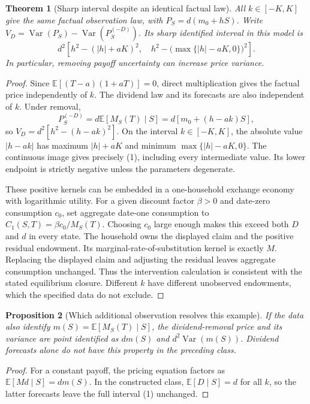 \documentclass[11pt,a4paper]{article}
\newtheorem{theorem}{Theorem}[section]
\newtheorem{proposition}[theorem]{Proposition}
\theoremstyle{definition}
\theoremstyle{remark}
\newcommand{\E}{\mathbb{E}}
\DeclareMathOperator{\Var}{Var}
\begin{document}
\begin{theorem}[Sharp interval despite an identical factual law]
All $k\in[-K,K]$ give the same factual observation law, with $P_S=d(m_0+hS)$. Write $V_D=\Var(P_S)-\Var(P_S^{(-D)})$. Its sharp identified interval in this model is
\[
 d^2\left[h^2-(|h|+aK)^2,\quad
 h^2-\bigl(\max\{|h|-aK,0\}\bigr)^2\right].\tag{1}
\]
In particular, removing payoff uncertainty can increase price variance.
\end{theorem}
\begin{proof}
Since $\E[(T-a)(1+aT)]=0$, direct multiplication gives the factual price independently of $k$. The dividend law and its forecasts are also independent of $k$. Under removal,
\[
 P_S^{(-D)}=d\E[M_S(T)\mid S]=d[m_0+(h-ak)S],
\]
so $V_D=d^2[h^2-(h-ak)^2]$. On the interval $k\in[-K,K]$, the absolute value $|h-ak|$ has maximum $|h|+aK$ and minimum $\max\{|h|-aK,0\}$. The continuous image gives precisely (1), including every intermediate value. Its lower endpoint is strictly negative unless the parameters degenerate.

These positive kernels can be embedded in a one-household exchange economy with logarithmic utility. For a given discount factor $\beta>0$ and date-zero consumption $c_0$, set aggregate date-one consumption to $C_1(S,T)=\beta c_0/M_S(T)$. Choosing $c_0$ large enough makes this exceed both $D$ and $d$ in every state. The household owns the displayed claim and the positive residual endowment. Its marginal-rate-of-substitution kernel is exactly $M$. Replacing the displayed claim and adjusting the residual leaves aggregate consumption unchanged. Thus the intervention calculation is consistent with the stated equilibrium closure. Different $k$ have different unobserved endowments, which the specified data do not exclude.
\end{proof}

\begin{proposition}[Which additional observation resolves this example]
If the data also identify $m(S)=\E[M_S(T)\mid S]$, the dividend-removal price and its variance are point identified as $dm(S)$ and $d^2\Var(m(S))$. Dividend forecasts alone do not have this property in the preceding class.
\end{proposition}
\begin{proof}
For a constant payoff, the pricing equation factors as $\E[Md\mid S]=dm(S)$. In the constructed class, $\E[D\mid S]=d$ for all $k$, so the latter forecasts leave the full interval (1) unchanged.
\end{proof}
\end{document}
